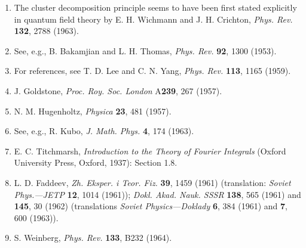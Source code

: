 
\begin{enumerate}
\item \label{ref:4.1}The cluster decomposition principle seems to have been first stated
explicitly in quantum field theory by E. H. Wichmann and J. H. Crichton,
\emph{Phys. Rev.} \textbf{132}, 2788 (1963).

\item \label{ref:4.2}See, e.g., B. Bakamjian and L. H. Thomas, \emph{Phys. Rev.}
\textbf{92}, 1300 (1953).

\item \label{ref:4.3}For references, see T. D. Lee and C. N. Yang, \emph{Phys. Rev.}
\textbf{113}, 1165 (1959).

\item \label{ref:4.4}J. Goldstone, \emph{Proc. Roy. Soc. London} A\textbf{239}, 267 (1957).

\item \label{ref:4.5}N. M. Hugenholtz, \emph{Physica} \textbf{23}, 481 (1957).

\item \label{ref:4.6}See, e.g., R. Kubo, \emph{J. Math. Phys.} \textbf{4}, 174 (1963).

\item \label{ref:4.7}E. C. Titchmarsh, \emph{Introduction to the Theory of Fourier
Integrals} (Oxford University Press, Oxford, 1937): Section 1.8.

\item \label{ref:4.8}L. D. Faddeev, \emph{Zh. Eksper. i Teor. Fiz.} \textbf{39}, 1459
(1961) (translation: \emph{Soviet Phys.---JETP} \textbf{12}, 1014 (1961));
\emph{Dokl. Akad. Nauk. SSSR} \textbf{138}, 565 (1961) and \textbf{145}, 30
(1962) (translations \emph{Soviet Physics---Doklady} \textbf{6}, 384 (1961)
and \textbf{7}, 600 (1963)).

\item \label{ref:4.9}S. Weinberg, \emph{Phys. Rev.} \textbf{133}, B232 (1964).
\end{enumerate}
